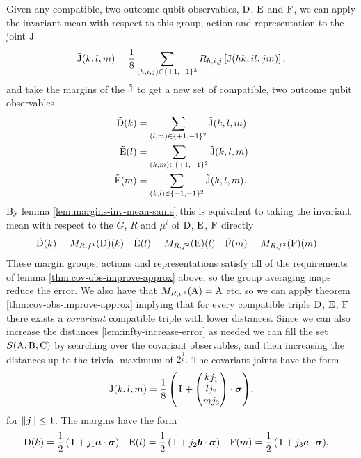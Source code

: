 Given any compatible, two outcome qubit observables, $\operatorname{D}$, $\operatorname{E}$ and $\operatorname{F}$, we can apply the invariant mean with respect to this group, action and representation to the joint $\operatorname{J}$
\begin{equation}
  \tilde{\operatorname{J}}(k,l,m) = \frac{1}{8}\sum_{(h,i,j)\in\{+1,-1\}^3} R_{{h}, {i}, {j}}\left[\operatorname{J}(hk, il, jm) \right],
\end{equation}
and take the margins of the $\tilde{\operatorname{J}}$ to get a new set of compatible, two outcome qubit observables
\begin{align}
  \tilde{\operatorname{D}}(k) &= \sum_{(l,m)\in\{+1,-1\}^2}\tilde{\operatorname{J}}(k,l,m)\\
  \tilde{\operatorname{E}}(l) &= \sum_{(k,m)\in\{+1,-1\}^2}\tilde{\operatorname{J}}(k,l,m)\\
  \tilde{\operatorname{F}}(m) &= \sum_{(k,l)\in\{+1,-1\}^2}\tilde{\operatorname{J}}(k,l,m).
\end{align}
By lemma \ref{lem:margins-inv-mean-same} this is equivalent to taking the invariant mean with respect to the $G$, $R$ and $\mu^i$ of $\operatorname{D}$, $\operatorname{E}$, $\operatorname{F}$ directly
\begin{align}
  \tilde{\operatorname{D}}(k) &= M_{R,f^1}(\operatorname{D})(k) & \tilde{\operatorname{E}}(l) &= M_{R,f^2}(\operatorname{E})(l) & \tilde{\operatorname{F}}(m) &= M_{R,f^3}(\operatorname{F})(m)
\end{align}
These margin groups, actions and representations satisfy all of the requirements of lemma \ref{thm:cov-obs-improve-approx} above, so the group averaging maps reduce the error. We also have that $M_{R,\mu^1}(\operatorname{A}) = \operatorname{A}$ etc. so we can apply theorem \ref{thm:cov-obs-improve-approx} implying that for every compatible triple $\operatorname{D}$, $\operatorname{E}$, $\operatorname{F}$ there exists a \emph{covariant} compatible triple with lower distances. Since we can also increase the distances \ref{lem:infty-increase-error} as needed we can fill the set $S(\operatorname{A}, \operatorname{B}, \operatorname{C})$ by searching over the covariant observables, and then increasing the distances up to the trivial maximum of $2^{\frac{1}{p}}$.
The covariant joints have the form
\begin{align}
  \opj(k,l,m) = \qbit[][+][\frac{1}{8}]{\begin{pmatrix}k j_1\\ l j_2 \\ m j_3\end{pmatrix}},
\end{align}
for ${\left\lVert{\bm{j}}\right\rVert}\leq 1$. The margins have the form
\begin{align}
  \opd(k) &= \qbit{j_1 \boa} &
                               \ope(l) &= \qbit{j_2 \bob}&
                                                           \opf(m) &= \qbit{j_3 \boc},
\end{align}
